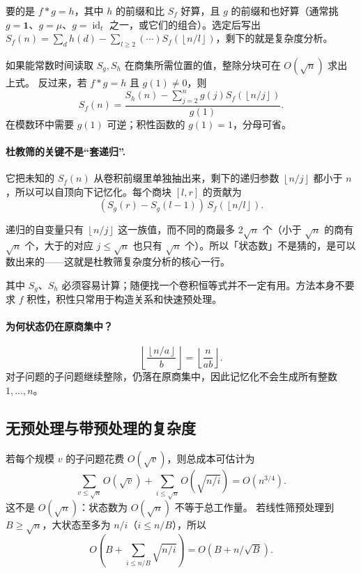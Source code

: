 \documentclass[UTF8,a4paper,11pt,oneside,openany,fontset=fandol]{ctexbook}
\theoremstyle{definition}
\newcommand{\one}{\mathbf 1}
\newcommand{\id}{\operatorname{id}}
\newcommand{\floor}[1]{\left\lfloor #1\right\rfloor}
\begin{document}
\begin{tip}[选 $g$ 的原则]
要的是 $f*g=h$，其中 $h$ 的前缀和比 $S_f$ 好算，且 $g$ 的前缀和也好算（通常挑 $g=\one$、$g=\mu$、$g=\id_t$ 之一，或它们的组合）。选定后写出 $S_f(n)=\sum_{d}h(d)-\sum_{l\ge2}(\cdots)S_f(\floor{n/l})$，剩下的就是复杂度分析。
\end{tip}

如果能常数时间读取 $S_g,S_h$ 在商集所需位置的值，整除分块可在 $O(\sqrt n)$ 求出上式。
反过来，若 $f*g=h$ 且 $g(1)\ne0$，则
\[
\boxed{S_f(n)=\frac{S_h(n)-\sum_{j=2}^n g(j)S_f(\floor{n/j})}{g(1)}}.
\]
在模数环中需要 $g(1)$ 可逆；积性函数的 $g(1)=1$，分母可省。


\paragraph{杜教筛的关键不是“套递归”.}
它把未知的 $S_f(n)$ 从卷积前缀里单独抽出来，剩下的递归参数 $\floor{n/j}$ 都小于 $n$，所以可以自顶向下记忆化。每个商块 $[l,r]$ 的贡献为
\[
 (S_g(r)-S_g(l-1))\,S_f(\floor{n/l}).
\]

\begin{tip}[记忆化为什么够用]
递归的自变量只有 $\floor{n/j}$ 这一族值，而不同的商最多 $2\sqrt n$ 个（小于 $\sqrt n$ 的商有 $\sqrt n$ 个，大于的对应 $j\le\sqrt n$ 也只有 $\sqrt n$ 个）。所以「状态数」不是猜的，是可以数出来的——这就是杜教筛复杂度分析的核心一行。
\end{tip}

其中 $S_g$、$S_h$ 必须容易计算；随便找一个卷积恒等式并不一定有用。方法本身不要求 $f$ 积性，积性只常用于构造关系和快速预处理。

\paragraph{为何状态仍在原商集中？}
\[
\floor{\frac{\floor{n/a}}b}=\floor{\frac n{ab}}.
\]
对子问题的子问题继续整除，仍落在原商集中，因此记忆化不会生成所有整数 $1,\ldots,n$。

\subsection{无预处理与带预处理的复杂度}
若每个规模 $v$ 的子问题花费 $O(\sqrt v)$，则总成本可估计为
\[
 \sum_{v\le\sqrt n}O(\sqrt v)
 +\sum_{i\le\sqrt n}O(\sqrt{n/i})=O(n^{3/4}).
\]
这不是 $O(\sqrt n)$：状态数为 $O(\sqrt n)$ 不等于总工作量。
若线性筛预处理到 $B\ge\sqrt n$，大状态至多为 $n/i$（$i\le n/B$），所以
\[
 O\left(B+\sum_{i\le n/B}\sqrt{n/i}\right)
 =O(B+n/\sqrt B).
\]
\end{document}
